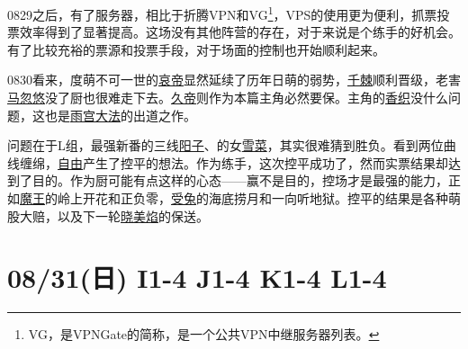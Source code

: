 0829之后，有了服务器，相比于折腾VPN和VG\footnote{VG，是VPNGate的简称，是一个公共VPN中继服务器列表。}，VPS的使用更为便利，抓票投票效率得到了显著提高。这场没有其他阵营的存在，对于来说是个练手的好机会。有了比较充裕的票源和投票手段，对于场面的控制也开始顺利起来。

0830看来，度萌不可一世的\uline{哀帝}显然延续了历年日萌的弱势，\uline{千棘}顺利晋级，老害\uline{马忽悠}没了厨也很难走下去。\uline{久帝}则作为本篇主角必然要保。主角的\uline{香织}没什么问题，这也是\uline{雨宫大法}的出道之作。

问题在于L组，最强新番的三线\uline{阳子}、的女\uline{雪菜}，其实很难猜到胜负。看到两位曲线缠绵，\uline{自由}产生了控平的想法。作为练手，这次控平成功了，然而实票结果却达到了目的。作为厨可能有点这样的心态——赢不是目的，控场才是最强的能力，正如\uline{魔王}的岭上开花和正负零，\uline{受兔}的海底捞月和一向听地狱。控平的结果是各种萌股大赔，以及下一轮\uline{晓美焰}的保送。

\section{08/31(日) I1-4 J1-4 K1-4 L1-4}


